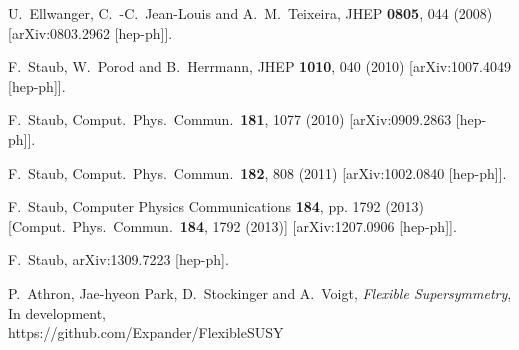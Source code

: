 \documentclass[final,3p,times,pdflatex]{elsarticle}
\begin{document}
\begin{thebibliography}{10}
  U.~Ellwanger, C.~-C.~Jean-Louis and A.~M.~Teixeira,
  JHEP {\bf 0805}, 044 (2008)
  [arXiv:0803.2962 [hep-ph]].


  F.~Staub, W.~Porod and B.~Herrmann,
  JHEP {\bf 1010}, 040 (2010)
  [arXiv:1007.4049 [hep-ph]].

  F.~Staub,
  Comput.\ Phys.\ Commun.\  {\bf 181}, 1077 (2010)
  [arXiv:0909.2863 [hep-ph]].

  F.~Staub,
  Comput.\ Phys.\ Commun.\  {\bf 182}, 808 (2011)
  [arXiv:1002.0840 [hep-ph]].

  F.~Staub,
  Computer Physics Communications {\bf 184}, pp. 1792 (2013)
  [Comput.\ Phys.\ Commun.\  {\bf 184}, 1792 (2013)]
  [arXiv:1207.0906 [hep-ph]].

  F.~Staub,
  arXiv:1309.7223 [hep-ph].

P.~Athron, Jae-hyeon Park, D.~Stockinger and A.~Voigt, {\it Flexible Supersymmetry}, In development, \\
https://github.com/Expander/FlexibleSUSY

%

\end{thebibliography}
\end{document}
